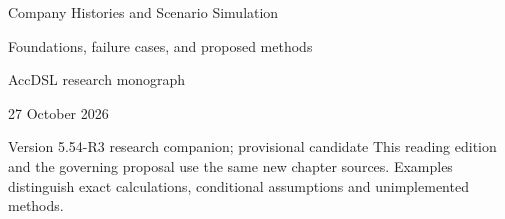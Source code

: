 \documentclass[11pt,a4paper]{report}
\begin{document}
\hypersetup{pageanchor=false}
\begin{titlepage}
{\Huge Company Histories and Scenario Simulation\par}
\vspace{12mm}
{\Large Foundations, failure cases, and proposed methods\par}
\vspace{8mm}
AccDSL research monograph\par 27 October 2026\par Version 5.54-R3 research companion; provisional candidate
\vfill
This reading edition and the governing proposal use the same new chapter sources. Examples distinguish exact calculations, conditional assumptions and unimplemented methods.
\end{titlepage}
\hypersetup{pageanchor=true}
\tableofcontents
\clearpage{}


























\clearpage\label{sim:body-end}

\begingroup\raggedright
\endgroup
\end{document}
